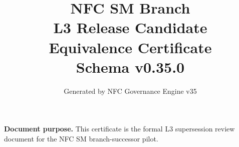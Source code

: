 \documentclass[11pt]{article}
\title{NFC SM Branch\\L3 Release Candidate\\Equivalence Certificate\\[1ex]\large Schema v0.35.0}
\author{Generated by NFC Governance Engine v35}
\date{}
\begin{document}
\maketitle
\tableofcontents
\bigskip
\noindent\textbf{Document purpose.} This certificate is the formal L3 supersession
review document for the NFC SM branch-successor pilot.
\vspace{1em}

\end{document}
